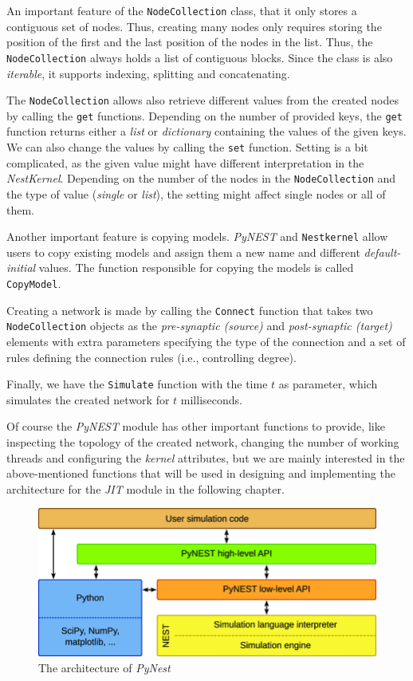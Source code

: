 An important feature of the \texttt{NodeCollection} class, that it only stores a contiguous set of nodes. Thus, creating many nodes only requires storing the position of the first and the last position of the nodes in the list. Thus, the \texttt{NodeCollection} always holds a list of contiguous blocks. Since the class is also \emph{iterable}, it supports indexing, splitting and concatenating.  


The \texttt{NodeCollection} allows also retrieve different values from the created nodes by calling the \texttt{get} functions. Depending on the number of provided keys, the \texttt{get} function returns either a \emph{list} or \emph{dictionary} containing the values of the given keys. We can also change the values by calling the \texttt{set} function. Setting is a bit complicated, as the given value might have different interpretation in the \emph{NestKernel}. Depending on the number of the nodes in the \texttt{NodeCollection} and the type of value (\emph{single} or \emph{list}), the setting might affect single nodes or all of them.

Another important feature is copying models. \emph{PyNEST} and \texttt{Nestkernel} allow users to copy existing models and assign them a new name and different \emph{default-initial} values. The function responsible for copying the models is called \texttt{CopyModel}.

Creating a network is made by calling the \texttt{Connect} function that takes two \texttt{NodeCollection} objects as the \emph{pre-synaptic (source)} and \emph{post-synaptic (target)} elements with extra parameters specifying the type of the connection and a set of rules defining the connection rules (i.e., controlling degree).

Finally, we have the \texttt{Simulate} function  with the time $t$ as parameter, which simulates the created network for $t$ milliseconds.

Of course the \emph{PyNEST} module has other important functions to provide, like inspecting the topology of the created network, changing the number of working threads and configuring the \emph{kernel} attributes, but we are mainly interested in the above-mentioned functions that will be used in designing and implementing the architecture for the \emph{JIT} module in the following chapter.
 
 
\vspace{0.5cm}
\begin{figure}[ht!]
\centering
\includegraphics[width=1\textwidth,height=1\textheight,keepaspectratio]{src/pic/The-architecture-of-PyNEST-The-lowest-level-is-the-simulation-engine-It-is-used-by.png}
\caption{The architecture of \emph{PyNest}}
\label{fig:pynest}
\end{figure}




